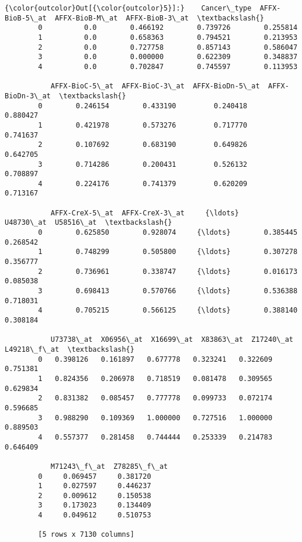 \documentclass[11pt]{article}
\begin{document}
\begin{Verbatim}[commandchars=\\\{\}]
{\color{outcolor}Out[{\color{outcolor}5}]:}    Cancer\_type  AFFX-BioB-5\_at  AFFX-BioB-M\_at  AFFX-BioB-3\_at  \textbackslash{}
        0          0.0        0.466192        0.739726        0.255814   
        1          0.0        0.658363        0.794521        0.213953   
        2          0.0        0.727758        0.857143        0.586047   
        3          0.0        0.000000        0.622309        0.348837   
        4          0.0        0.702847        0.745597        0.113953   
        
           AFFX-BioC-5\_at  AFFX-BioC-3\_at  AFFX-BioDn-5\_at  AFFX-BioDn-3\_at  \textbackslash{}
        0        0.246154        0.433190         0.240418         0.880427   
        1        0.421978        0.573276         0.717770         0.741637   
        2        0.107692        0.683190         0.649826         0.642705   
        3        0.714286        0.200431         0.526132         0.708897   
        4        0.224176        0.741379         0.620209         0.713167   
        
           AFFX-CreX-5\_at  AFFX-CreX-3\_at     {\ldots}       U48730\_at  U58516\_at  \textbackslash{}
        0        0.625850        0.928074     {\ldots}        0.385445   0.268542   
        1        0.748299        0.505800     {\ldots}        0.307278   0.356777   
        2        0.736961        0.338747     {\ldots}        0.016173   0.085038   
        3        0.698413        0.570766     {\ldots}        0.536388   0.718031   
        4        0.705215        0.566125     {\ldots}        0.388140   0.308184   
        
           U73738\_at  X06956\_at  X16699\_at  X83863\_at  Z17240\_at  L49218\_f\_at  \textbackslash{}
        0   0.398126   0.161897   0.677778   0.323241   0.322609     0.751381   
        1   0.824356   0.206978   0.718519   0.081478   0.309565     0.629834   
        2   0.831382   0.085457   0.777778   0.099733   0.072174     0.596685   
        3   0.988290   0.109369   1.000000   0.727516   1.000000     0.889503   
        4   0.557377   0.281458   0.744444   0.253339   0.214783     0.646409   
        
           M71243\_f\_at  Z78285\_f\_at  
        0     0.069457     0.381720  
        1     0.027597     0.446237  
        2     0.009612     0.150538  
        3     0.173023     0.134409  
        4     0.049612     0.510753  
        
        [5 rows x 7130 columns]
\end{Verbatim}
            
\end{document}
